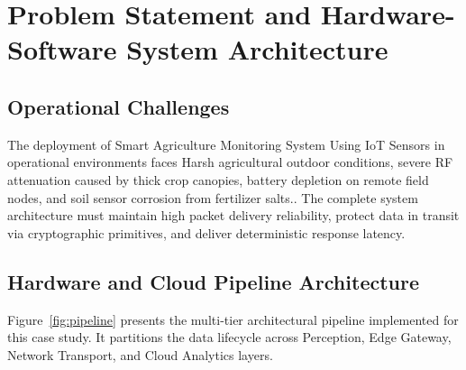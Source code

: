 \section{Problem Statement and Hardware-Software System Architecture}

\subsection{Operational Challenges}
The deployment of Smart Agriculture Monitoring System Using IoT Sensors in operational environments faces Harsh agricultural outdoor conditions, severe RF attenuation caused by thick crop canopies, battery depletion on remote field nodes, and soil sensor corrosion from fertilizer salts.. The complete system architecture must maintain high packet delivery reliability, protect data in transit via cryptographic primitives, and deliver deterministic response latency.

\subsection{Hardware and Cloud Pipeline Architecture}
Figure~\ref{fig:pipeline} presents the multi-tier architectural pipeline implemented for this case study. It partitions the data lifecycle across Perception, Edge Gateway, Network Transport, and Cloud Analytics layers.

